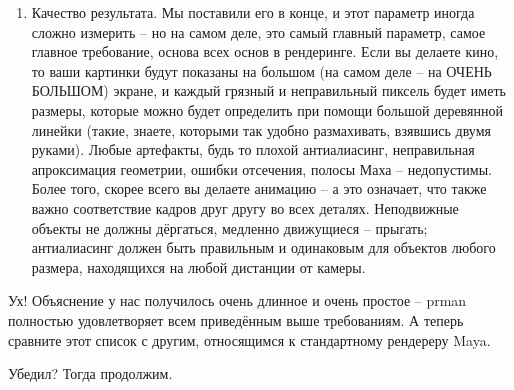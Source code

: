 \begin{enumerate}
\item                 Качество результата. Мы поставили его в
    конце, и этот параметр иногда сложно измерить – но на самом деле,
    это самый главный параметр, самое главное требование, основа всех
    основ в рендеринге. Если вы делаете кино, то ваши картинки будут
    показаны на большом (на самом деле – на ОЧЕНЬ БОЛЬШОМ) экране, и
    каждый грязный и неправильный пиксель будет иметь размеры, которые
    можно будет определить при помощи большой деревянной линейки
    (такие, знаете, которыми так удобно размахивать, взявшись двумя
    руками). Любые артефакты, будь то плохой антиалиасинг, неправильная
    апроксимация геометрии, ошибки отсечения, полосы Маха –
    недопустимы. Более того, скорее всего вы делаете анимацию – а это
    означает, что также важно соответствие кадров друг другу во всех
    деталях. Неподвижные объекты не должны дёргаться, медленно
    движущиеся – прыгать; антиалиасинг должен быть правильным и
    одинаковым для объектов любого размера, находящихся на любой
    дистанции от камеры.
\end{enumerate}

 Ух! Объяснение у нас получилось очень длинное и
    очень простое – prman полностью
    удовлетворяет всем приведённым выше требованиям. А теперь сравните
    этот список с другим, относящимся к стандартному рендереру Maya.
  

 Убедил? Тогда продолжим.